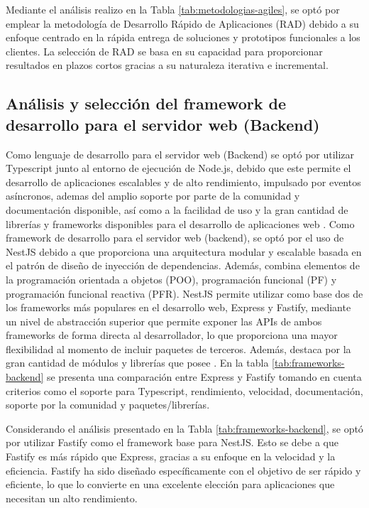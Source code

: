 Mediante el análisis realizo en la Tabla \ref{tab:metodologias-agiles}, se optó por emplear la metodología de
Desarrollo Rápido de Aplicaciones (RAD) debido a su enfoque centrado en la rápida entrega de soluciones y
prototipos funcionales a los clientes. La selección de RAD se basa en su capacidad para proporcionar resultados
en plazos cortos gracias a su naturaleza iterativa e incremental.

\subsection{Análisis y selección del framework de desarrollo para el servidor web (Backend)}

Como lenguaje de desarrollo para el servidor web (Backend) se optó por utilizar Typescript junto al entorno de
ejecución de Node.js, debido que este permite el desarrollo de aplicaciones escalables y de alto rendimiento,
impulsado por eventos asíncronos, ademas del amplio soporte por parte de la comunidad y documentación disponible,
así como a la facilidad de uso y la gran cantidad de librerías y frameworks disponibles para el desarrollo de aplicaciones
web \cite{haroDesarrolloBackendPara}.
\bigbreak
Como framework de desarrollo para el servidor web (backend), se optó por el uso de NestJS debido a que proporciona
una arquitectura modular y escalable basada en el patrón de diseño de inyección de dependencias. Además, combina
elementos de la programación orientada a objetos (POO), programación funcional (PF) y programación funcional
reactiva (PFR). NestJS permite utilizar como base dos de los frameworks más populares en el desarrollo web, Express y
Fastify, mediante un nivel de abstracción superior que permite exponer las APIs de ambos frameworks de forma
directa al desarrollador, lo que proporciona una mayor flexibilidad al momento de incluir paquetes de terceros.
Además, destaca por la gran cantidad de módulos y librerías que posee \cite{phamDEVELOPINGBACKENDWEB2020}.
\bigbreak
En la tabla \ref{tab:frameworks-backend} se presenta una comparación entre Express y Fastify tomando en cuenta
criterios como el soporte para Typescript, rendimiento, velocidad, documentación, soporte por la comunidad y
paquetes/librerías.



Considerando el análisis presentado en la Tabla \ref{tab:frameworks-backend}, se optó por utilizar Fastify como
el framework base para NestJS. Esto se debe a que Fastify es más rápido que Express, gracias a su enfoque en la
velocidad y la eficiencia. Fastify ha sido diseñado específicamente con el objetivo de ser rápido y eficiente,
lo que lo convierte en una excelente elección para aplicaciones que necesitan un alto rendimiento.

